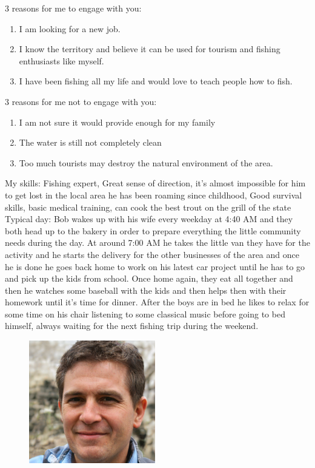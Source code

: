 \par 3 reasons for me to engage with you:
\begin{enumerate} 
\item I am looking for a new job. 
\item I know the territory and believe it can be used for tourism and fishing enthusiasts like myself. 
\item I have been fishing all my life and would love to teach people how to fish. 
\end{enumerate}
3 reasons for me not to engage with you:
\begin{enumerate}
\item I am not sure it would provide enough for my family 
\item The water is still not completely clean 
\item Too much tourists may destroy the natural environment of the area. 
\end{enumerate}
My skills: 
\newline
Fishing expert, Great sense of direction, it's almost impossible for him to get lost in the local area he has been roaming since childhood, Good survival skills, basic medical training, can cook the best trout on the grill of the state \newline
Typical day: 
\newline
Bob wakes up with his wife every weekday at 4:40 AM and they both head up to the bakery in order to prepare everything the little community needs during the day. At around 7:00 AM he takes the little van they have for the activity and he starts the delivery for the other businesses of the area and once he is done he goes back home to work on his latest car project until he has to go and pick up the kids from school. Once home again, they eat all together and then he watches some baseball with the kids and then helps then with their homework until it's time for dinner. After the boys are in bed he likes to relax for some time on his chair listening to some classical music before going to bed himself, always waiting for the next fishing trip during the weekend. \newline

\begin{figure}
\includegraphics[width=5.5cm]{Img/Bob.PNG}
\end{figure} 


